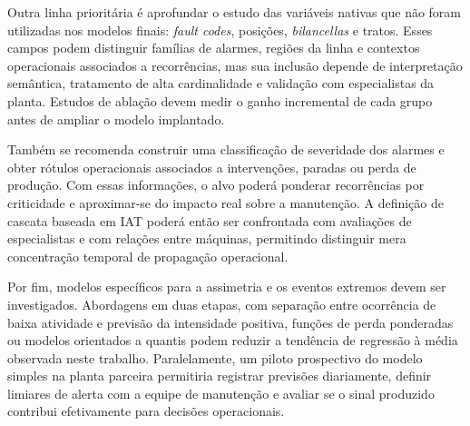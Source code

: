 Outra linha prioritária é aprofundar o estudo das variáveis nativas que não foram utilizadas nos modelos finais: \textit{fault codes}, posições, \textit{bilancellas} e tratos. Esses campos podem distinguir famílias de alarmes, regiões da linha e contextos operacionais associados a recorrências, mas sua inclusão depende de interpretação semântica, tratamento de alta cardinalidade e validação com especialistas da planta. Estudos de ablação devem medir o ganho incremental de cada grupo antes de ampliar o modelo implantado.

Também se recomenda construir uma classificação de severidade dos alarmes e obter rótulos operacionais associados a intervenções, paradas ou perda de produção. Com essas informações, o alvo poderá ponderar recorrências por criticidade e aproximar-se do impacto real sobre a manutenção. A definição de cascata baseada em IAT poderá então ser confrontada com avaliações de especialistas e com relações entre máquinas, permitindo distinguir mera concentração temporal de propagação operacional.

Por fim, modelos específicos para a assimetria e os eventos extremos devem ser investigados. Abordagens em duas etapas, com separação entre ocorrência de baixa atividade e previsão da intensidade positiva, funções de perda ponderadas ou modelos orientados a quantis podem reduzir a tendência de regressão à média observada neste trabalho. Paralelamente, um piloto prospectivo do modelo simples na planta parceira permitiria registrar previsões diariamente, definir limiares de alerta com a equipe de manutenção e avaliar se o sinal produzido contribui efetivamente para decisões operacionais.
